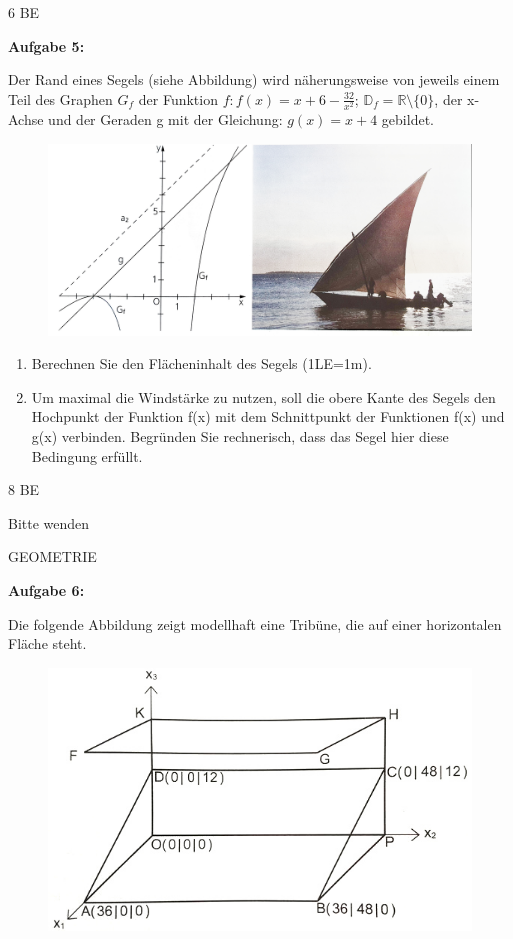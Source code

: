 \documentclass[a4paper,12pt]{article}
\newcommand{\Aufgabe}[1]{
  {
  \vspace*{0.5cm}
  \textsf{\textbf{Aufgabe #1}}
  \vspace*{0.2cm}
  
  }
}
\begin{document}
\begin{flushright}6 BE \end{flushright}
\newpage





\Aufgabe {5:} 
Der Rand eines Segels (siehe Abbildung) wird näherungsweise von jeweils einem Teil des Graphen $G_f$ der Funktion $f: f(x)=x+6-\frac{32}{x^2}$;
$ \mathbb{D}_f= \mathbb{R}\setminus \{0\}$, der x-Achse und der Geraden g mit der Gleichung: $g(x)=x+4$ gebildet.

\begin{figure}[h!]
  \begin{center}
    \includegraphics[width=1 \linewidth]{bols201202.jpeg}
  \end{center}
\end{figure}

\begin{enumerate}[label={\alph*)}]
\item Berechnen Sie den Flächeninhalt des Segels (1LE=1m).
\item Um maximal die Windstärke zu nutzen, soll die obere Kante des Segels den Hochpunkt der Funktion f(x) mit dem Schnittpunkt der Funktionen f(x) und g(x) verbinden. Begründen Sie rechnerisch, dass das Segel hier diese Bedingung erfüllt. 
\end{enumerate}  
\begin{flushright}8 BE \end{flushright}
\begin{flushright}Bitte wenden \end{flushright}
\newpage
\addtolength{\voffset}{-2cm}

GEOMETRIE
\Aufgabe{6:} 
Die folgende Abbildung zeigt modellhaft eine Tribüne, die auf einer horizontalen Fläche steht.

\begin{figure}[h!]
  \begin{center}
    \includegraphics[width=0.5\linewidth]{tribüne.jpg}
  \end{center}
\end{figure}
\end{document}
